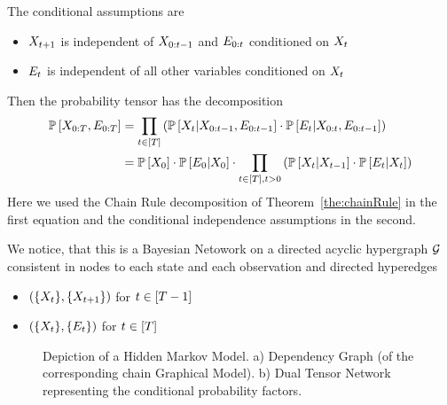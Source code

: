 The conditional assumptions are 
\begin{itemize}
	\item $X_{t+1}$ is independent of $X_{0:t-1}$ and $E_{0:t}$ conditioned on $X_{t}$
	\item $E_{t}$ is independent of all other variables conditioned on $X_{t}$
\end{itemize}

Then the probability tensor has the decomposition 
\begin{align}
	\mathbb{P}\left[X_{0:T},E_{0:T}\right] 
	& = \prod_{t\in[T]}
	 \left( \mathbb{P}\left[X_{t}|X_{0:t-1},E_{0:t-1}\right] \cdot \mathbb{P}\left[E_{t}|X_{0:t},E_{0:t-1}\right] \right) \\
	& = \mathbb{P}\left[X_{0}\right] \cdot \mathbb{P}\left[E_{0}|X_{0}\right] \cdot \prod_{t\in[T], t>0} 
	\left( \mathbb{P}\left[X_{t}|X_{t-1}\right] \cdot \mathbb{P}\left[E_{t}|X_{t}\right] \right)
\end{align}
Here we used the Chain Rule decomposition of Theorem~\ref{the:chainRule} in the first equation and the conditional independence assumptions in the second.

We notice, that this is a Bayesian Netowork on a directed acyclic hypergraph $\mathcal{G}$ consistent in nodes to each state and each observation and directed hyperedges
\begin{itemize}
	\item $(\{X_{t}\}, \{X_{t+1}\})$ for $t\in[T-1]$
	\item $(\{X_{t}\}, \{E_{t}\})$ for $t\in[T]$
\end{itemize}


\begin{figure}[h]
\begin{center}
	
\end{center}
\caption{Depiction of a Hidden Markov Model. 
	a) Dependency Graph (of the corresponding chain Graphical Model).
	b) Dual Tensor Network representing the conditional probability factors.}
\label{fig:HMM}
\end{figure}




